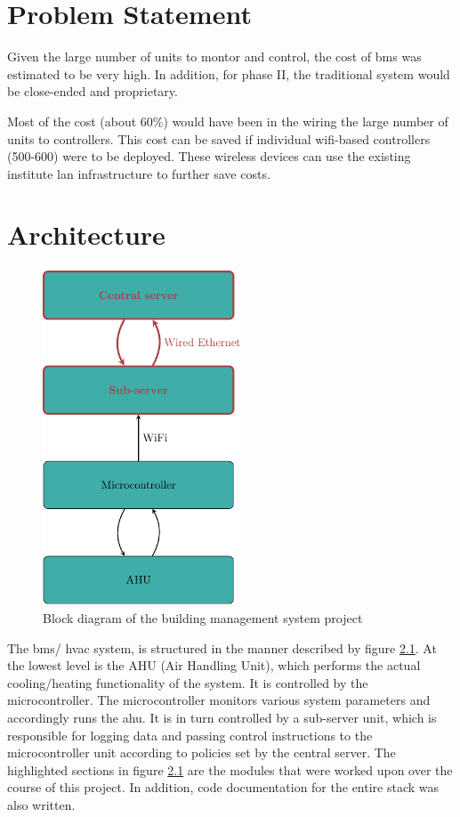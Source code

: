 \documentclass[letterpaper,11pt]{report}
\begin{document}
\newpage
\chapter{Problem Statement}\label{chapter:problemstatement}
\onehalfspacing
Given the large number of units to montor and control, the cost of \ac{bms} was estimated to be very high. In addition, for phase II, the traditional system would be close-ended and proprietary.
\par
Most of the cost (about 60\%) would have been in the wiring the large number of units to controllers. This cost can be saved if individual \ac{wifi}-based controllers (500-600) were to be deployed. These wireless devices can use the existing institute \ac{lan} infrastructure to further save costs.

\newpage
\chapter{Architecture}\label{chapter:architecture}
\onehalfspacing
\begin{figure}[h]
\includegraphics[width=6cm, height=10cm]{arch}
\centering
\captionsetup{justification=centering}
\caption{Block diagram of the building management system project}
\label{fig:arch}
\end{figure}
The \ac{bms}/ \ac{hvac} system, is structured in the manner described by figure \ref{fig:arch}. At the lowest level is the AHU (Air Handling Unit), which performs the actual cooling/heating functionality of the system. It is controlled by the microcontroller. The microcontroller monitors various system parameters and accordingly runs the \ac{ahu}. It is in turn controlled by a sub-server unit, which is responsible for logging data and passing control instructions to the microcontroller unit according to policies set by the central server. The highlighted sections in figure \ref{fig:arch} are the modules that were worked upon over the course of this project. In addition, code documentation for the entire stack was also written.
\end{document}
